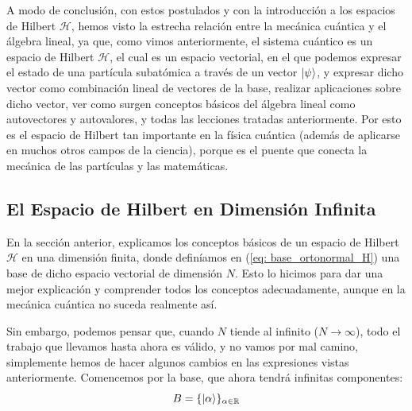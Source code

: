 \documentclass{article}
\numberwithin{equation}{section} %
\begin{document}
    \vspace{5mm}

    A modo de conclusión, con estos postulados y con la introducción a los espacios de Hilbert \( \mathcal{H} \), hemos visto la estrecha relación entre la mecánica cuántica y el álgebra lineal, ya que, como vimos anteriormente, el sistema cuántico es un espacio de Hilbert \( \mathcal{H} \), el cual es un espacio vectorial, en el que podemos expresar el estado de una partícula subatómica a través de un vector \( \ket{\psi} \), y expresar dicho vector como combinación lineal de vectores de la base, realizar aplicaciones sobre dicho vector, ver como surgen conceptos básicos del álgebra lineal como autovectores y autovalores, y todas las lecciones tratadas anteriormente. Por esto es el espacio de Hilbert tan importante en la física cuántica (además de aplicarse en muchos otros campos de la ciencia), porque es el puente que conecta la mecánica de las partículas y las matemáticas.

    \vspace{10mm}





    \subsection{El Espacio de Hilbert en Dimensión Infinita}

    \vspace{5mm}

    En la sección anterior, explicamos los conceptos básicos de un espacio de Hilbert \( \mathcal{H} \) en una dimensión finita, donde definíamos en (\ref{eq: base_ortonormal_H}) una base de dicho espacio vectorial de dimensión \( N \). Esto lo hicimos para dar una mejor explicación y comprender todos los conceptos adecuadamente, aunque en la mecánica cuántica no suceda realmente así. 

    \vspace{5mm}

    Sin embargo, podemos pensar que, cuando \( N \) tiende al infinito (\( N \rightarrow \infty \)), todo el trabajo que llevamos hasta ahora es válido, y no vamos por mal camino, simplemente hemos de hacer algunos cambios en las expresiones vistas anteriormente. Comencemos por la base, que ahora tendrá infinitas componentes:
    \begin{equation}
        B = \{ \ket{\alpha} \} _{\alpha \in \mathbb{R}}
        \label{eq: base_ortonormal_L2}
    \end{equation} 
\end{document}
